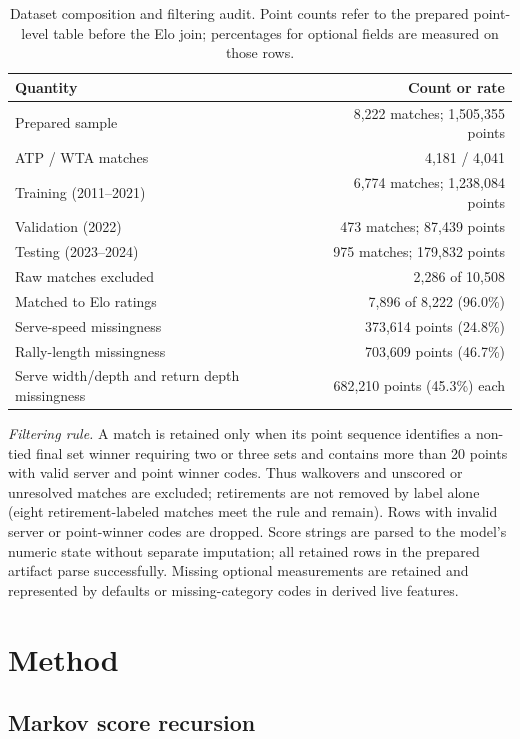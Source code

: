 \documentclass{article} %
\begin{document}
\begin{table}[t]
\caption{Dataset composition and filtering audit. Point counts refer to the
prepared point-level table before the Elo join; percentages for optional fields
are measured on those rows.}
\label{tab:data-audit}
\centering
\small
\begin{tabular}{lr}
\hline
Quantity & Count or rate \\
\hline
Prepared sample & 8,222 matches; 1,505,355 points \\
ATP / WTA matches & 4,181 / 4,041 \\
Training (2011--2021) & 6,774 matches; 1,238,084 points \\
Validation (2022) & 473 matches; 87,439 points \\
Testing (2023--2024) & 975 matches; 179,832 points \\
Raw matches excluded & 2,286 of 10,508 \\
Matched to Elo ratings & 7,896 of 8,222 (96.0\%) \\
Serve-speed missingness & 373,614 points (24.8\%) \\
Rally-length missingness & 703,609 points (46.7\%) \\
Serve width/depth and return depth missingness & 682,210 points (45.3\%) each \\
\hline
\end{tabular}
\parbox{0.96\linewidth}{\footnotesize \emph{Filtering rule.} A match is retained
only when its point sequence identifies a non-tied final set winner requiring
two or three sets and contains more than 20 points with valid server and point
winner codes. Thus walkovers and unscored or unresolved matches are excluded;
retirements are not removed by label alone (eight retirement-labeled matches
meet the rule and remain). Rows with invalid server or point-winner codes are
dropped. Score strings are parsed to the model's numeric state without separate
imputation; all retained rows in the prepared artifact parse successfully.
Missing optional measurements are retained and represented by defaults or
missing-category codes in derived live features.}
\end{table}

\section{Method}

\subsection{Markov score recursion}
\end{document}
